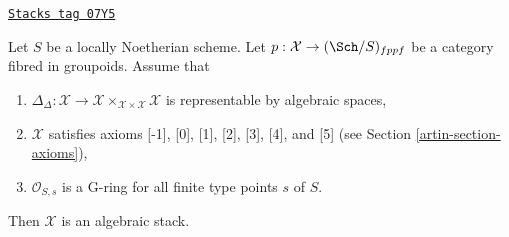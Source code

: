 \begin{proposition}
\label{artin-proposition-second-diagonal-representable}
\href{https://stacks.math.columbia.edu/tag/07Y5}{\texttt{Stacks tag 07Y5}}

Let $S$ be a locally Noetherian scheme. Let
$p : \mathcal{X} \to (\Sch/S)_{fppf}$ be a category fibred in groupoids.
Assume that
\begin{enumerate}
\item $\Delta_\Delta : \mathcal{X} \to
\mathcal{X} \times_{\mathcal{X} \times \mathcal{X}} \mathcal{X}$
is representable by algebraic spaces,
\item $\mathcal{X}$ satisfies axioms [-1], [0], [1], [2], [3], [4], and [5]
(see Section \ref{artin-section-axioms}),
\item $\mathcal{O}_{S, s}$ is a G-ring for all finite type points $s$ of $S$.
\end{enumerate}
Then $\mathcal{X}$ is an algebraic stack.
\end{proposition}

